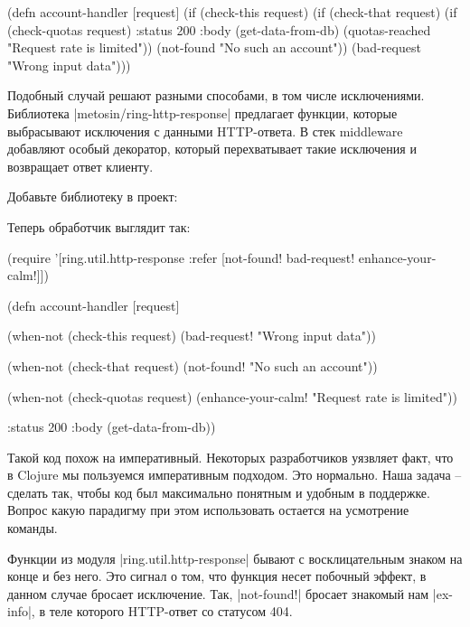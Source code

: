 \begin{code}
(defn account-handler
  [request]
  (if (check-this request)
    (if (check-that request)
      (if (check-quotas request)
        {:status 200
         :body (get-data-from-db)}
        (quotas-reached "Request rate is limited"))
      (not-found "No such an account"))
    (bad-request "Wrong input data")))
\end{code}

Подобный случай решают разными способами, в том числе исключениями. Библиотека
\spverb|metosin/ring-http-response| предлагает функции, которые выбрасывают исключения
с данными HTTP-ответа. В стек middleware добавляют особый декоратор, который
перехватывает такие исключения и возвращает ответ клиенту.

Добавьте библиотеку в проект:

\begin{code}
\end{code}

Теперь обработчик выглядит так:

\begin{code}
(require '[ring.util.http-response
           :refer [not-found!
                   bad-request!
                   enhance-your-calm!]])

(defn account-handler
  [request]

  (when-not (check-this request)
    (bad-request! "Wrong input data"))

  (when-not (check-that request)
    (not-found! "No such an account"))

  (when-not (check-quotas request)
    (enhance-your-calm! "Request rate is limited"))

  {:status 200
   :body (get-data-from-db)})
\end{code}

Такой код похож на императивный. Некоторых разработчиков уязвляет факт, что в
Clojure мы пользуемся императивным подходом. Это нормально. Наша задача --
сделать так, чтобы код был максимально понятным и удобным в поддержке. Вопрос
какую парадигму при этом использовать остается на усмотрение команды.

Функции из модуля \spverb|ring.util.http-response| бывают с восклицательным знаком на
конце и без него. Это сигнал о том, что функция несет побочный эффект, в данном
случае бросает исключение. Так, \spverb|not-found!| бросает знакомый нам \spverb|ex-info|, в
теле которого HTTP-ответ со статусом 404.

